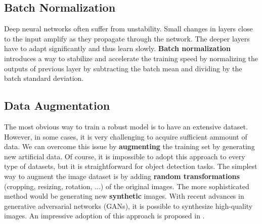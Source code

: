 \subsection{Batch Normalization}
Deep neural networks often suffer from unstability. Small changes in layers close to the input amplify as they propagate through the network. The deeper layers have to adapt significantly and thus learn slowly. \textbf{Batch normalization} introduces a way to stabilize and accelerate the training speed by normalizing the outputs of previous layer by subtracting the batch mean and dividing by the batch standard deviation.

\subsection{Data Augmentation}
The most obvious way to train a robust model is to have an extensive dataset. However, in some cases, it is very challenging to acquire sufficient ammount of data. We can overcome this issue by 
\textbf{augmenting} the training set by generating new artificial data. Of course, it is impossible to adopt this approach to every type of datasets, but it is straightforward for object detection tasks. The simplest way to augment the image dataset is by adding \textbf{random transformations} (cropping, resizing, rotation, ...) of the original images. The more sophisticated method would be generating new \textbf{synthetic} images. With recent advances in generative adversarial networks (GANs), it is possible to synthesize high-quality images. An impressive adoption of this approach is proposed in \cite{wei2019generative}.


